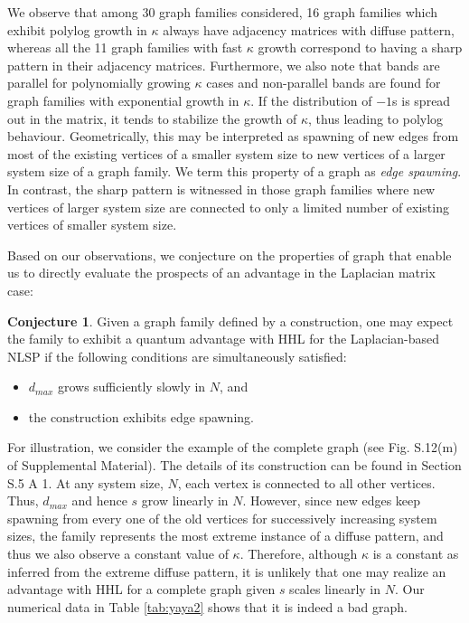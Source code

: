 \documentclass[%
 reprint,
 superscriptaddress,
 amsmath,amssymb,
 aps,
 pra,
floatfix,
nofootinbib,
]{revtex4-2}
\theoremstyle{definition}
\newtheorem{conjecture}{Conjecture}
\theoremstyle{remark}
\begin{document}
\begin{itemize}
       We observe that among 30 graph families considered, 16 graph families which exhibit polylog growth in $\kappa$ always have adjacency matrices with diffuse pattern, whereas all the 11 graph families with fast $\kappa$ growth correspond to having a sharp pattern in their adjacency matrices. Furthermore, we also note that bands are parallel for polynomially growing $\kappa$ cases and non-parallel bands are found for graph families with exponential growth in  $\kappa$. If the distribution of $-1$s is spread out in the matrix, it tends to stabilize the growth of $\kappa$, thus leading to polylog behaviour. Geometrically, this may be interpreted as spawning of new edges from most of the existing vertices of a smaller system size to new vertices of a larger system size of a graph family. We term this property of a graph as \emph{edge spawning}. In contrast, the sharp pattern is witnessed in those graph families where new vertices of larger system size are connected to only a limited number of existing vertices of smaller system size.
    
\end{itemize}

Based on our observations, we conjecture on the properties of graph that enable us to directly evaluate the prospects of an advantage in the Laplacian matrix case: 

\begin{conjecture}\label{conj:patterns}
Given a graph family defined by a construction, one may expect the family to exhibit a quantum advantage with HHL for the Laplacian-based NLSP if the following conditions are simultaneously satisfied: 
\begin{itemize} 
\item $d_{max}$ grows sufficiently slowly in $N$, and 
\item the construction exhibits edge spawning.
\end{itemize}
\end{conjecture} 

For illustration, we consider the example of the complete graph (see Fig. S.12(m) of Supplemental Material). The details of its construction can be found in Section S.5 A 1. At any system size, $N$, each vertex is connected to all other vertices. Thus, $d_{max}$ and hence $s$ grow linearly in $N$. However, since new edges keep spawning from every one of the old vertices for successively increasing system sizes, the family represents the most extreme instance of a diffuse pattern, and thus we also observe a constant value of $\kappa$. Therefore, although $\kappa$ is a constant as inferred from the extreme diffuse pattern, it is unlikely that one may realize an advantage with HHL for a complete graph given $s$ scales linearly in $N$. Our numerical data in Table \ref{tab:yaya2} shows that it is indeed a bad graph. 
\end{document}

